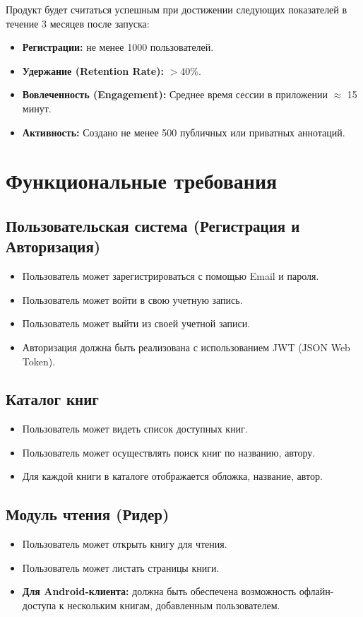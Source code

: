 \documentclass[12pt,a4paper]{article}
\begin{document}
Продукт будет считаться успешным при достижении следующих показателей в течение 3 месяцев после запуска:

\begin{itemize}
    \item \textbf{Регистрации:} не менее 1000 пользователей.
    \item \textbf{Удержание (Retention Rate):} $> 40\%$.
    \item \textbf{Вовлеченность (Engagement):} Среднее время сессии в приложении $\approx$ 15 минут.
    \item \textbf{Активность:} Создано не менее 500 публичных или приватных аннотаций.
\end{itemize}

\section{Функциональные требования}

\subsection{Пользовательская система (Регистрация и Авторизация)}
\begin{itemize}
    \item Пользователь может зарегистрироваться с помощью Email и пароля.
    \item Пользователь может войти в свою учетную запись.
    \item Пользователь может выйти из своей учетной записи.
    \item Авторизация должна быть реализована с использованием JWT (JSON Web Token).
\end{itemize}

\subsection{Каталог книг}
\begin{itemize}
    \item Пользователь может видеть список доступных книг.
    \item Пользователь может осуществлять поиск книг по названию, автору.
    \item Для каждой книги в каталоге отображается обложка, название, автор.
\end{itemize}

\subsection{Модуль чтения (Ридер)}
\begin{itemize}
    \item Пользователь может открыть книгу для чтения.
    \item Пользователь может листать страницы книги.
    \item \textbf{Для Android-клиента:} должна быть обеспечена возможность офлайн-доступа к нескольким книгам, добавленным пользователем.
\end{itemize}
\end{document}
